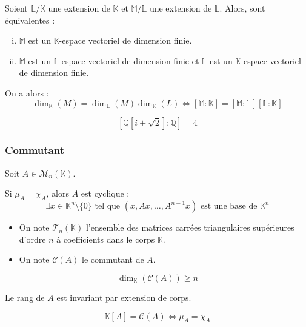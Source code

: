 	\begin{corollary}
		Soient $\mathbb{L}/\mathbb{K}$ une extension de $\mathbb{K}$ et $\mathbb{M}/\mathbb{L}$ une extension de $\mathbb{L}$. Alors, sont équivalentes :
		\begin{enumerate}[(i)]
			\item $\mathbb{M}$ est un $\mathbb{K}$-espace vectoriel de dimension finie.
			\item $\mathbb{M}$ est un $\mathbb{L}$-espace vectoriel de dimension finie et $\mathbb{L}$ est un $\mathbb{K}$-espace vectoriel de dimension finie. 
		\end{enumerate}
		On a alors :
		\[ \dim_{\mathbb{K}}(M) = \dim_{\mathbb{L}}(M) \dim_{\mathbb{K}}(L) \iff [\mathbb{M}:\mathbb{K}] = [\mathbb{M}:\mathbb{L}] [\mathbb{L}:\mathbb{K}] \]
	\end{corollary}
	
	
	\begin{example}
		\[ [\mathbb{Q}[i + \sqrt{2}]:\mathbb{Q}] = 4 \]
	\end{example}

	\subsubsection{Commutant}
	
	Soit $A \in \mathcal{M}_n(\mathbb{K})$.
	
	
	\begin{lemma}
		Si $\mu_A = \chi_A$, alors $A$ est cyclique :
		\[ \exists x \in \mathbb{K}^n \setminus \{ 0 \} \text{ tel que } (x, Ax, \dots, A^{n-1}x) \text{ est une base de } \mathbb{K}^n \]
	\end{lemma}
	
	
	\begin{notation}
		\begin{itemize}
			\item On note $\mathcal{T}_n(\mathbb{K})$ l'ensemble des matrices carrées triangulaires supérieures d'ordre $n$ à coefficients dans le corps $\mathbb{K}$.
			\item On note $\mathcal{C}(A)$ le commutant de $A$.
		\end{itemize}
	\end{notation}
	
	\begin{lemma}
		\[ \dim_{\mathbb{K}}(\mathcal{C}(A)) \geq n \]
	\end{lemma}
	
	\begin{lemma}
		Le rang de $A$ est invariant par extension de corps.
	\end{lemma}
	
	
	\begin{theorem}
		\[ \mathbb{K}[A] = \mathcal{C}(A) \iff \mu_A = \chi_A \]
	\end{theorem}


